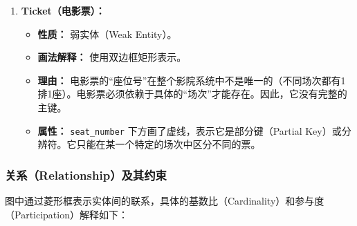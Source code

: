 \documentclass[a4paper]{article}
\begin{document}
\begin{enumerate}
    \item \textbf{Ticket（电影票）：}
    \begin{itemize}
        \item \textbf{性质：} 弱实体（Weak Entity）。
        \item \textbf{画法解释：} 使用双边框矩形表示。
        \item \textbf{理由：} 电影票的“座位号”在整个影院系统中不是唯一的（不同场次都有1排1座）。电影票必须依赖于具体的“场次”才能存在。因此，它没有完整的主键。
        \item \textbf{属性：} \texttt{seat\_number} 下方画了虚线，表示它是部分键（Partial Key）或分辨符。它只能在某一个特定的场次中区分不同的票。
    \end{itemize}
\end{enumerate}

\subsubsection{关系（Relationship）及其约束}
图中通过菱形框表示实体间的联系，具体的基数比（Cardinality）和参与度（Participation）解释如下：
\end{document}
